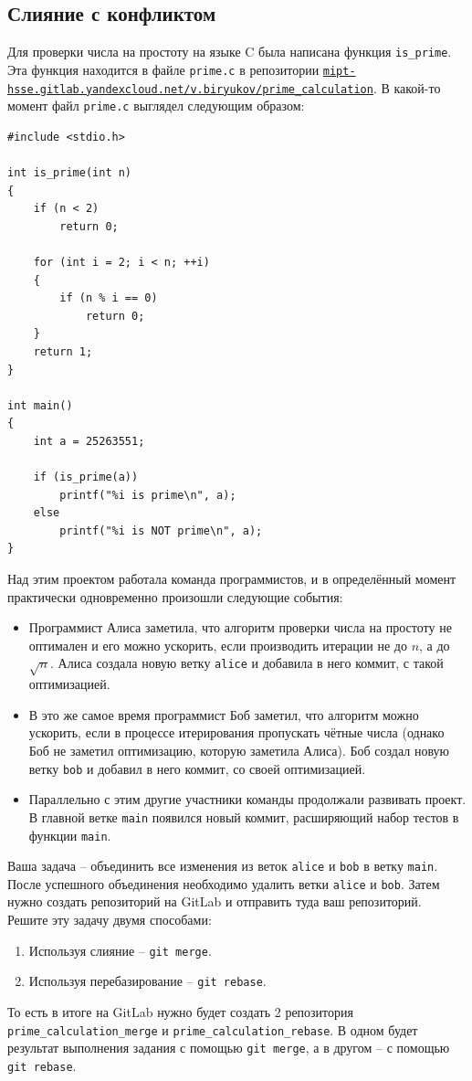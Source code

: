 \documentclass{article}
\begin{document}
\subsection{Слияние с конфликтом}
Для проверки числа на простоту на языке C была написана функция \texttt{is\_prime}. Эта функция находится в файле \texttt{prime.c} в репозитории \href{https://mipt-hsse.gitlab.yandexcloud.net/v.biryukov/prime_calculation}{\texttt{mipt-hsse.gitlab.yandexcloud.net/v.biryukov/prime\_calculation}}. В какой-то момент файл \texttt{prime.c} выглядел следующим образом:
\begin{lstlisting}
#include <stdio.h>

int is_prime(int n)
{
    if (n < 2) 
        return 0;

    for (int i = 2; i < n; ++i)
    {
        if (n % i == 0)
            return 0;
    }
    return 1;
}

int main()
{
    int a = 25263551;

    if (is_prime(a))
        printf("%i is prime\n", a);
    else
        printf("%i is NOT prime\n", a);
}
\end{lstlisting}
Над этим проектом работала команда программистов, и в определённый момент практически одновременно произошли следующие события:
\begin{itemize}
\item Программист Алиса заметила, что алгоритм проверки числа на простоту не оптимален и его можно ускорить, если производить итерации не до $n$, а до $\sqrt{n}$. Алиса создала новую ветку \texttt{alice} и добавила в него коммит, с такой оптимизацией.
\item В это же самое время программист Боб заметил, что алгоритм можно ускорить, если в процессе итерирования пропускать чётные числа (однако Боб не заметил оптимизацию, которую заметила Алиса). Боб создал новую ветку \texttt{bob} и добавил в него коммит, со своей оптимизацией.
\item Параллельно с этим другие участники команды продолжали развивать проект. В главной ветке \texttt{main} появился новый коммит, расширяющий набор тестов в функции \texttt{main}.
\end{itemize}
Ваша задача -- объединить все изменения из веток \texttt{alice} и \texttt{bob} в ветку \texttt{main}. После успешного объединения необходимо удалить ветки \texttt{alice} и \texttt{bob}.
Затем нужно создать репозиторий на GitLab и отправить туда ваш репозиторий.
\\[5mm]
\noindent Решите эту задачу двумя способами:
\begin{enumerate}
\item Используя слияние -- \texttt{git merge}.
\item Используя перебазирование -- \texttt{git rebase}.
\end{enumerate}
То есть в итоге на GitLab нужно будет создать 2 репозитория \texttt{prime\_calculation\_merge} и \texttt{prime\_calculation\_rebase}. В одном будет результат выполнения задания с помощью \texttt{git merge}, а в другом -- с помощью \texttt{git rebase}.
\end{document}
